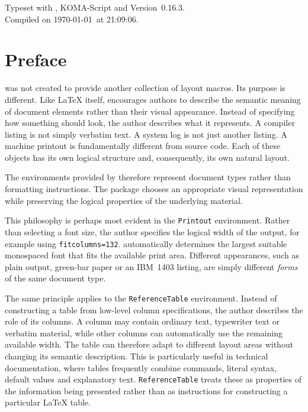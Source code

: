 \documentclass[
11pt,
a4paper,
oneside
]{scrbook}
\begin{document}
\bigskip

\noindent
Typeset with \usedtexengine, KOMA-Script and
\MDWordmark Version~0.16.3.\\
Compiled on \today\ at 21:09:06.


\chapter*{Preface}


\MDWordmark was not created to provide another collection of layout
macros. Its purpose is different. 
Like \LaTeX{} itself, \MDWordmark encourages authors to describe the
semantic meaning of document elements rather than their visual
appearance. 
Instead of specifying how something should look, the author
describes what it represents.
A compiler listing is not simply verbatim text. A system log is not just
another listing. A machine printout is fundamentally different from
source code. Each of these objects has its own logical structure and,
consequently, its own natural layout.

The environments provided by \MDWordmark therefore represent document
types rather than formatting instructions. The package chooses an
appropriate visual representation while preserving the logical
properties of the underlying material.

This philosophy is perhaps most evident in the \texttt{Printout}
environment. Rather than selecting a font size, the author specifies the
logical width of the output, for example using
\texttt{fitcolumns=132}. \MDWordmark automatically determines the
largest suitable monospaced font that fits the available print area.
Different appearances, such as plain output, green-bar paper or an
IBM~1403 listing, are simply different \emph{forms} of the same document
type.

The same principle applies to the \texttt{ReferenceTable} environment.
Instead of constructing a table from low-level column specifications,
the author describes the role of its columns. A column may contain
ordinary text, typewriter text or verbatim material, while other columns
can automatically use the remaining available width. The table can
therefore adapt to different layout areas without changing its semantic
description.
This is particularly useful in technical documentation, where tables
frequently combine commands, literal syntax, default values and
explanatory text. \texttt{ReferenceTable} treats these as properties of
the information being presented rather than as instructions for
constructing a particular \LaTeX{} table.
\end{document}
